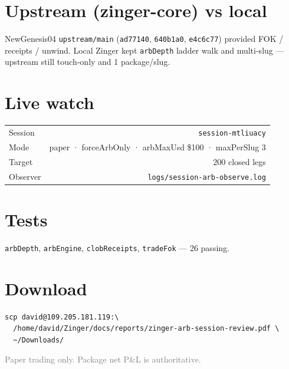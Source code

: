 \documentclass[11pt,a4paper]{article}
\begin{document}
\section{Upstream (zinger-core) vs local}
NewGenesis04 \texttt{upstream/main} (\texttt{ad77140}, \texttt{640b1a0}, \texttt{e4c6c77}) provided FOK / receipts / unwind. Local Zinger kept \texttt{arbDepth} ladder walk and multi-slug --- upstream still touch-only and 1 package/slug.

\section{Live watch}
\begin{table}[h]
\centering
\begin{tabular}{@{}lr@{}}
\toprule
Session & \texttt{session-mtliuacy} \\
Mode & paper · forceArbOnly · arbMaxUsd \$100 · maxPerSlug 3 \\
Target & 200 closed legs \\
Observer & \texttt{logs/session-arb-observe.log} \\
\bottomrule
\end{tabular}
\end{table}

\section{Tests}
\texttt{arbDepth}, \texttt{arbEngine}, \texttt{clobReceipts}, \texttt{tradeFok} --- 26 passing.

\section{Download}
\begin{verbatim}
scp david@109.205.181.119:\
  /home/david/Zinger/docs/reports/zinger-arb-session-review.pdf \
  ~/Downloads/
\end{verbatim}

\vfill
\begin{center}
\small\textcolor{gray}{Paper trading only. Package net P\&L is authoritative.}
\end{center}
\end{document}
